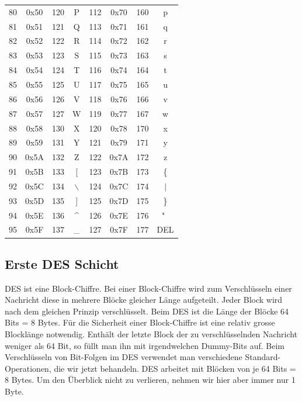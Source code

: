 \documentclass[%
11pt,%
twoside,%
titlepage,%
german,%
headsepline%
]{scrartcl}
\begin{document}
\begin{longtable}{|c|c|c|c||c|c|c|c|}
80 & 0x50 & 120 & P & 112 & 0x70 & 160 & p \\
81 & 0x51 & 121 & Q & 113 & 0x71 & 161 & q \\
82 & 0x52 & 122 & R & 114 & 0x72 & 162 & r \\
83 & 0x53 & 123 & S & 115 & 0x73 & 163 & s \\
84 & 0x54 & 124 & T & 116 & 0x74 & 164 & t \\
85 & 0x55 & 125 & U & 117 & 0x75 & 165 & u \\
86 & 0x56 & 126 & V & 118 & 0x76 & 166 & v \\
87 & 0x57 & 127 & W & 119 & 0x77 & 167 & w \\
88 & 0x58 & 130 & X & 120 & 0x78 & 170 & x \\
89 & 0x59 & 131 & Y & 121 & 0x79 & 171 & y \\
90 & 0x5A & 132 & Z & 122 & 0x7A & 172 & z \\
91 & 0x5B & 133 & [ & 123 & 0x7B & 173 & \{ \\
92 & 0x5C & 134 & $\backslash$ & 124 & 0x7C & 174 &$\mid$\\
93 & 0x5D & 135 & ] & 125 & 0x7D & 175 & \} \\
94 & 0x5E & 136 & \^{} & 126 & 0x7E & 176 & "~ \\
95 & 0x5F & 137 & \_ & 127 & 0x7F & 177 & DEL \\
\hline
\end{longtable}

\subsection{Erste DES Schicht}
DES ist eine Block-Chiffre. Bei einer Block-Chiffre wird zum Verschlüsseln einer Nachricht diese in mehrere Blöcke gleicher Länge aufgeteilt. Jeder Block wird nach dem gleichen Prinzip verschlüsselt.
Beim DES ist die Länge der Blöcke 64 Bits = 8 Bytes.
Für die Sicherheit einer Block-Chiffre ist eine relativ grosse Blocklänge notwendig.
Enthält der letzte Block der zu verschlüsselnden Nachricht weniger als 64 Bit, so füllt man ihn mit irgendwelchen Dummy-Bits auf.
Beim Verschlüsseln von Bit-Folgen im DES verwendet man verschiedene Standard-Operationen, die wir jetzt behandeln. 
DES arbeitet mit Blöcken von je 64 Bits = 8 Bytes. Um den Überblick nicht zu verlieren, nehmen wir hier aber immer nur 1 Byte.
\end{document}
